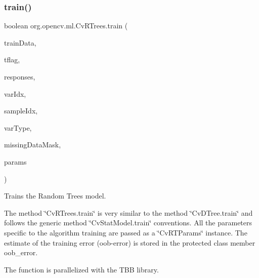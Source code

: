 \subsubsection{\texorpdfstring{train()}{train()}\hspace{0.1cm}{\footnotesize\ttfamily [1/2]}}
{\footnotesize\ttfamily boolean org.\+opencv.\+ml.\+Cv\+R\+Trees.\+train (\begin{DoxyParamCaption}\item[{\mbox{\hyperlink{classorg_1_1opencv_1_1core_1_1_mat}{Mat}}}]{train\+Data,  }\item[{int}]{tflag,  }\item[{\mbox{\hyperlink{classorg_1_1opencv_1_1core_1_1_mat}{Mat}}}]{responses,  }\item[{\mbox{\hyperlink{classorg_1_1opencv_1_1core_1_1_mat}{Mat}}}]{var\+Idx,  }\item[{\mbox{\hyperlink{classorg_1_1opencv_1_1core_1_1_mat}{Mat}}}]{sample\+Idx,  }\item[{\mbox{\hyperlink{classorg_1_1opencv_1_1core_1_1_mat}{Mat}}}]{var\+Type,  }\item[{\mbox{\hyperlink{classorg_1_1opencv_1_1core_1_1_mat}{Mat}}}]{missing\+Data\+Mask,  }\item[{\mbox{\hyperlink{classorg_1_1opencv_1_1ml_1_1_cv_r_t_params}{Cv\+R\+T\+Params}}}]{params }\end{DoxyParamCaption})}

Trains the Random Trees model.

The method \char`\"{}\+Cv\+R\+Trees.\+train\char`\"{} is very similar to the method \char`\"{}\+Cv\+D\+Tree.\+train\char`\"{} and follows the generic method \char`\"{}\+Cv\+Stat\+Model.\+train\char`\"{} conventions. All the parameters specific to the algorithm training are passed as a \char`\"{}\+Cv\+R\+T\+Params\char`\"{} instance. The estimate of the training error ({\ttfamily oob-\/error}) is stored in the protected class member {\ttfamily oob\+\_\+error}.

The function is parallelized with the T\+BB library.


